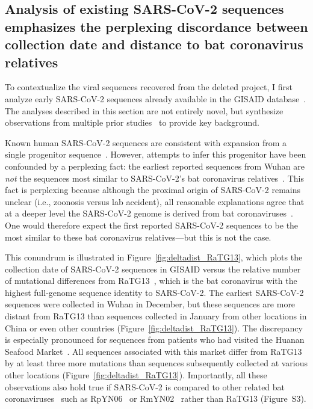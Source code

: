 \documentclass[9pt,twocolumn,twoside]{gsajnl_modified}
\begin{document}
\subsection{Analysis of existing SARS-CoV-2 sequences emphasizes the perplexing discordance between collection date and distance to bat coronavirus relatives}
To contextualize the viral sequences recovered from the deleted project, I first analyze early SARS-CoV-2 sequences already available in the GISAID database~\citep{shu2017gisaid}.
The analyses described in this section are not entirely novel, but synthesize observations from multiple prior studies~\citep{kumar2021evolutionary,pekar2021timing,rambaut2020dynamic,forster2020phylogenetic,pipes2021assessing} to provide key background.

Known human SARS-CoV-2 sequences are consistent with expansion from a single progenitor sequence~\citep{kumar2021evolutionary,pekar2021timing,rambaut2020dynamic,forster2020phylogenetic,pipes2021assessing}.
However, attempts to infer this progenitor have been confounded by a perplexing fact: the earliest reported sequences from Wuhan are \emph{not} the sequences most similar to SARS-CoV-2's bat coronavirus relatives~\citep{pipes2021assessing}.
This fact is perplexing because although the proximal origin of SARS-CoV-2 remains unclear (i.e., zoonosis versus lab accident), all reasonable explanations agree that at a deeper level the SARS-CoV-2 genome is derived from bat coronaviruses~\citep{lytras2021exploring}.
One would therefore expect the first reported SARS-CoV-2 sequences to be the most similar to these bat coronavirus relatives---but this is not the case.

This conundrum is illustrated in Figure~\ref{fig:deltadist_RaTG13}, which plots the collection date of SARS-CoV-2 sequences in GISAID versus the relative number of mutational differences from RaTG13~\citep{zhou2020pneumonia}, which is the bat coronavirus with the highest full-genome sequence identity to SARS-CoV-2.
The earliest SARS-CoV-2 sequences were collected in Wuhan in December, but these sequences are more distant from RaTG13 than sequences collected in January from other locations in China or even other countries (Figure~\ref{fig:deltadist_RaTG13}).
The discrepancy is especially pronounced for sequences from patients who had visited the Huanan Seafood Market~\citep{WHO2021origins}.
All sequences associated with this market differ from RaTG13 by at least three more mutations than sequences subsequently collected at various other locations (Figure~\ref{fig:deltadist_RaTG13}).
Importantly, all these observations also hold true if SARS-CoV-2 is compared to other related bat coronaviruses~\citep{lytras2021exploring} such as RpYN06~\citep{zhou2021identification} or RmYN02~\citep{zhou2020novel} rather than RaTG13 (Figure~S3).
\end{document}
